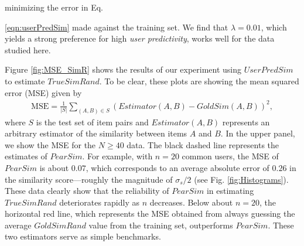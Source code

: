 \documentclass[11pt]{article}
\begin{document}
minimizing the error in Eq. {\ref{eqn:userPredSim} made against the training
set. We find that $\lambda = 0.01$, which yields a strong preference for high
{\em user predictivity}, works well for the data studied here.

Figure \ref{fig:MSE_SimR} shows the results of our experiment using
$UserPredSim$ to estimate $TrueSimRand$. To be clear, these plots are showing
the mean squared error (MSE) given by
\begin{align}
\mathrm{MSE} = \frac{1}{\left|S\right|}\sum_{(A,B) \in S}
{\left(Estimator(A,B) - GoldSim(A,B)\right)^2},
\end{align}
where $S$ is the test set of item pairs and $Estimator(A, B)$ represents an
arbitrary estimator of the similarity between items $A$ and $B$. In the upper
panel, we show the MSE for the $N \geq 40$ data. The black dashed line
represents the estimates of $PearSim$. For example, with $n = 20$ common users,
the MSE of $PearSim$ is about $0.07$, which corresponds to an average absolute
error of $0.26$ in the similarity score---roughly the magnitude of $\sigma_s/2$
(see Fig. \ref{fig:Histograms}). These data clearly show that the reliability of
$PearSim$ in estimating $TrueSimRand$ deteriorates rapidly as $n$ decreases.
Below about $n = 20$, the horizontal red line, which represents the MSE obtained
from always guessing the average $GoldSimRand$ value from the training set,
outperforms $PearSim$. These two estimators serve as simple benchmarks.

}
\end{document}
